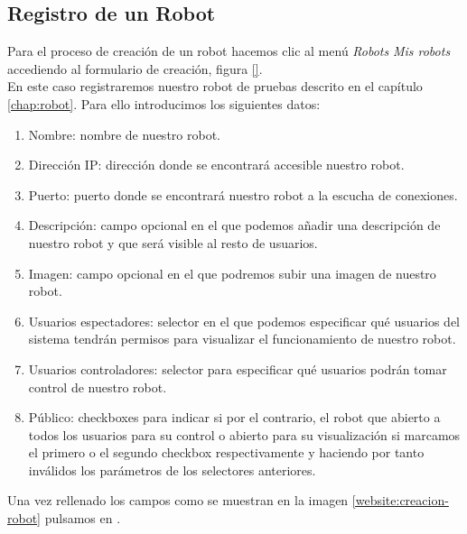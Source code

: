 \subsection{Registro de un Robot}
\label{sec:creacion-robot}

Para el proceso de creación de un robot hacemos clic al menú \emph{Robots} \textrightarrow \enspace \emph{Mis robots} accediendo al formulario de creación, figura \ref{}.\\

En este caso registraremos nuestro robot de pruebas descrito en el capítulo \ref{chap:robot}. Para ello introducimos los siguientes datos:

\begin{enumerate}
 \item Nombre: nombre de nuestro robot.
 \item Dirección IP: dirección donde se encontrará accesible nuestro robot.
 \item Puerto: puerto donde se encontrará nuestro robot a la escucha de conexiones.
 \item Descripción: campo opcional en el que podemos añadir una descripción de nuestro robot y que será visible al resto de usuarios.
 \item Imagen: campo opcional en el que podremos subir una imagen de nuestro robot.
 \item Usuarios espectadores: selector en el que podemos especificar qué usuarios del sistema tendrán permisos para visualizar el funcionamiento de nuestro robot.
 \item Usuarios controladores: selector para especificar qué usuarios podrán tomar control de nuestro robot.
 \item Público: checkboxes para indicar si por el contrario, el robot que abierto a todos los usuarios para su control o abierto para su visualización si marcamos el primero o el segundo checkbox respectivamente
 y haciendo por tanto inválidos los parámetros de los selectores anteriores.
\end{enumerate}

Una vez rellenado los campos como se muestran en la imagen \ref{website:creacion-robot} pulsamos en .

